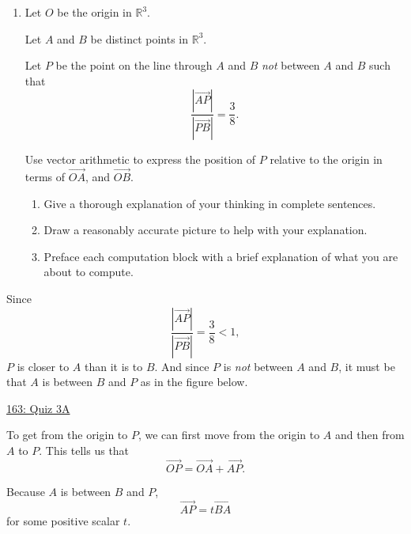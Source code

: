 \documentclass{ximera}
\begin{document}
\begin{question} \label{Q99e8e}
\begin{enumerate}

\item Let $O$ be the origin in $\mathbb{R}^3$.

Let $A$ and $B$ be distinct points in $\mathbb{R}^3$.

Let $P$ be the point on the line through $A$ and $B$ \emph{not} between $A$ and $B$ such that
\[
     \frac{\left| \overrightarrow{AP} \right|}{\left| \overrightarrow{PB} \right|} = \frac{3}{8} . 
\]

Use vector arithmetic to express the position of $P$ relative to the origin in terms of $\overrightarrow{OA}$, and $\overrightarrow{OB}$.

\begin{enumerate}

\item Give a thorough explanation of your thinking in complete sentences.

\item Draw a reasonably accurate picture to help with your explanation.

\item Preface each computation block with a brief explanation of what you are about to compute.


\end{enumerate}
\end{enumerate}

\begin{explanation}
Since
\[
   \frac{\left| \overrightarrow{AP} \right|}{\left| \overrightarrow{PB} \right|} = \frac{3}{8}  < 1 ,
\]
$P$ is closer to $A$ than it is to $B$. And since $P$ is \emph{not} between $A$ and $B$, it must be that $A$ is between $B$ and $P$ as in the figure below.

\begin{onlineOnly}
    \begin{center}
\end{center}
\end{onlineOnly}

\href{https://www.desmos.com/3d/mefaqb0bvv}{163: Quiz 3A}

To get from the origin to $P$, we can first move from the origin to $A$ and then from $A$ to $P$. This tells us that
\[
      \overrightarrow{OP} = \overrightarrow{OA} +\overrightarrow{AP}.
\]

Because $A$ is between $B$ and $P$, 
\[
    \overrightarrow{AP} = t \overrightarrow{BA}
\]
for some positive scalar $t$. 


\end{explanation}
\end{question}
\end{document}
